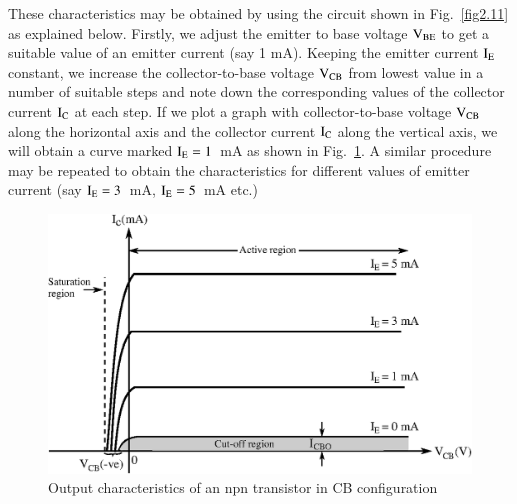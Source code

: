  These characteristics may be obtained by using the circuit shown in Fig.~\ref{fig2.11} as explained below. Firstly, we adjust the emitter to base voltage $\textrm{V}_{\text{BE}}$ to get a suitable value of an emitter current (say 1 mA). Keeping the emitter current $\textrm{I}_{\textrm{E}}$ constant, we increase the collector-to-base voltage $\textrm{V}_{\text{CB}}$ from lowest value in a number of suitable steps and note down the corresponding values of the collector current $\textrm{I}_{\textrm{C}}$ at each step. If we plot a graph with collector-to-base voltage $\textrm{V}_{\text{CB}}$ along the horizontal axis and the collector current $\textrm{I}_{\textrm{C}}$ along the vertical axis, we will obtain a curve marked $\textrm{I}_{\textrm{E}}=1$~mA as shown in Fig.~\ref{fig2.13}. A similar procedure may be repeated to obtain the characteristics for different values of emitter current (say $\textrm{I}_{\textrm{E}}=3$~mA, $\textrm{I}_{\textrm{E}}=5$~mA etc.)
\begin{figure}[H]
\centering
\includegraphics{chap2/fig13.eps}
\caption{Output characteristics of an npn transistor in CB configuration}\label{fig2.13}
\end{figure}

